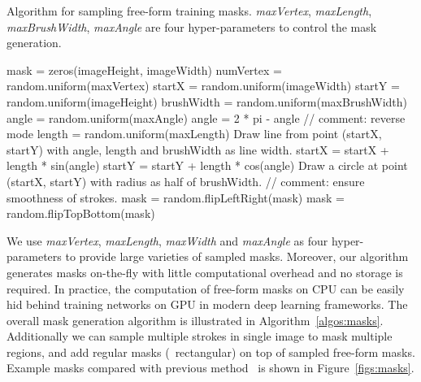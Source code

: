 \documentclass[10pt,twocolumn,letterpaper]{article}
\begin{document}
\begin{algorithm}
  \caption{Algorithm for sampling free-form training masks. \textit{maxVertex}, \textit{maxLength}, \textit{maxBrushWidth}, \textit{maxAngle} are four hyper-parameters to control the mask generation.}
  \label{algos:masks}
  \begin{algorithmic}
    \State mask = zeros(imageHeight, imageWidth)
    \State numVertex = random.uniform(maxVertex)
    \State startX = random.uniform(imageWidth)
    \State startY = random.uniform(imageHeight)
    \State brushWidth = random.uniform(maxBrushWidth)
    \State angle = random.uniform(maxAngle)
    \State angle = 2 * pi - angle // comment: reverse mode
    \EndIf  
    \State length = random.uniform(maxLength)
    \State Draw line from point (startX, startY) with angle, length and brushWidth as line width.
    \State startX = startX + length * sin(angle)
    \State startY = startY + length * cos(angle)
    \State Draw a circle at point (startX, startY) with radius as half of brushWidth. // comment: ensure smoothness of strokes.
    \EndFor
    \State mask = random.flipLeftRight(mask)
    \State mask = random.flipTopBottom(mask)
  \end{algorithmic}
\end{algorithm}

We use \textit{maxVertex}, \textit{maxLength}, \textit{maxWidth} and \textit{maxAngle} as four hyper-parameters to provide large varieties of sampled masks. Moreover, our algorithm generates masks on-the-fly with little computational overhead and no storage is required. In practice, the computation of free-form masks on CPU can be easily hid behind training networks on GPU in modern deep learning frameworks. The overall mask generation algorithm is illustrated in Algorithm~\ref{algos:masks}. Additionally we can sample multiple strokes in single image to mask multiple regions, and add regular masks (\eg~rectangular) on top of sampled free-form masks. Example masks compared with previous method~\cite{liu2018image} is shown in Figure~\ref{figs:masks}.
\end{document}
